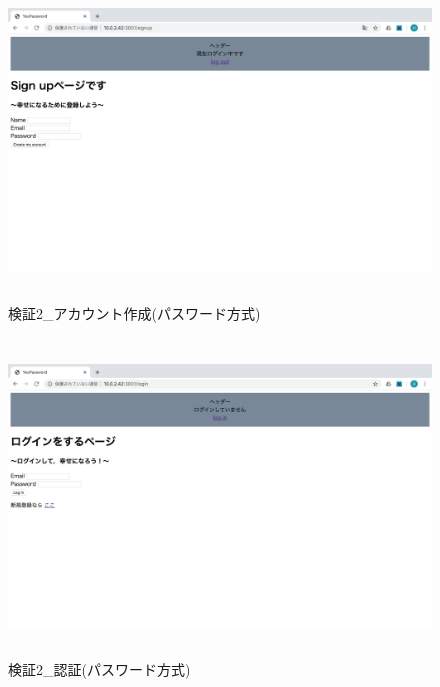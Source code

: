     \vspace{4cm}%
    \begin{figure}[H]
        \includegraphics[height=8.4cm]{./fig/chapter4/inspect_2/password_screnn/sign_up.png}
        \caption{検証2\_アカウント作成(パスワード方式)}
        \label{検証２アカウント作成(パスワード方式)}
    \end{figure}

    \vspace{4cm}%
    \begin{figure}[H]
        \includegraphics[height=8.4cm]{./fig/chapter4/inspect_2/password_screnn/login.png}
        \caption{検証2\_認証(パスワード方式)}
        \label{検証２認証(パスワード方式)}
    \end{figure}

